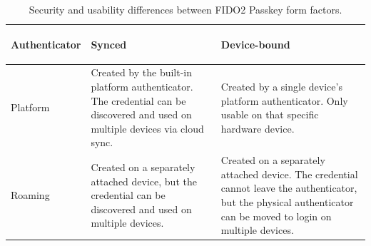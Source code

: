 ﻿\begin{table}[htbp]
    \centering
    \renewcommand{\arraystretch}{1.5} 
    \caption{Security and usability differences between FIDO2 Passkey form factors.}
    \label{tab:passkey_form_factors}
    \begin{tabularx}{\textwidth}{
        >{\bfseries\raggedright\arraybackslash}m{2.8cm} %
        >{\raggedright\arraybackslash}X               %
        >{\raggedright\arraybackslash}X               %
    }
        \toprule
        Authenticator & \textbf{Synced} & \textbf{Device-bound} \\
        \midrule
        
        Platform & Created by the built-in platform authenticator. The credential can be discovered and used on multiple devices via cloud sync. & Created by a single device's platform authenticator. Only usable on that specific hardware device. \\
        
        \arrayrulecolor{gray!40}\midrule\arrayrulecolor{black} 
        
        Roaming & Created on a separately attached device, but the credential can be discovered and used on multiple devices. & Created on a separately attached device. The credential cannot leave the authenticator, but the physical authenticator can be moved to login on multiple devices. \\
        
        \bottomrule
    \end{tabularx}
\end{table}

